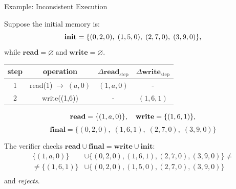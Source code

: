 \documentclass{zkdl-presentation-template}
\begin{document}
    \begin{frame}{Example: Inconsistent Execution}
        \begin{example}
            \small
            Suppose the initial memory is:
            \vspace{-5px}
            \begin{equation*}
                \mathbf{init} =\{(0,2,0), \; (1,5,0), \; (2,7,0), \; (3,9,0)\},
                \vspace{-5px}
            \end{equation*}
            while $\mathbf{read} = \varnothing \; \text{and} \; \mathbf{write} = \varnothing$.
            \pause

            \vspace{6px}
            \begin{center}
                \begin{tabular}{c|c|c|c}
                \textbf{step} & \textbf{operation} & $\Delta\mathbf{read}_{\text{step}}$ & $\Delta\mathbf{write}_{\text{step}}$\\\hline
                1 & read(1)$  \; \to \; (a, 0)$ & $(1,a,0)$ & -        \\
                2 & write((1,6))                & -         & $(1,6,1)$\\
                \end{tabular}
            \end{center}
            \pause

            \vspace{5px}
            \begin{equation*}
                \mathbf{read} = \{(1,a,0)\},\quad
                \mathbf{write} = \{(1,6,1)\},
                \vspace{-5px}
            \end{equation*}
            \begin{equation*}
                \mathbf{final} = \{(0,2,0), \; (1,6,1), \; (2,7,0), \; (3,9,0)\}
            \end{equation*}
            \pause

            The verifier checks $\mathbf{read} \cup \mathbf{final} = \mathbf{write} \cup \mathbf{init}$:
            \vspace{-5px}
            \begin{align*}
                \{(1,a,0)\} &\cup \{(0,2,0), (1,6,1), (2,7,0), (3,9,0)\} \neq \\
                \neq \{(1,6,1)\} &\cup \{(0,2,0), (1,5,0), (2,7,0), (3,9,0)\} \\[-20px]
            \end{align*}
            and \emph{rejects}.
        \end{example}
    \end{frame}

    \makeclosingframe
\end{document}
